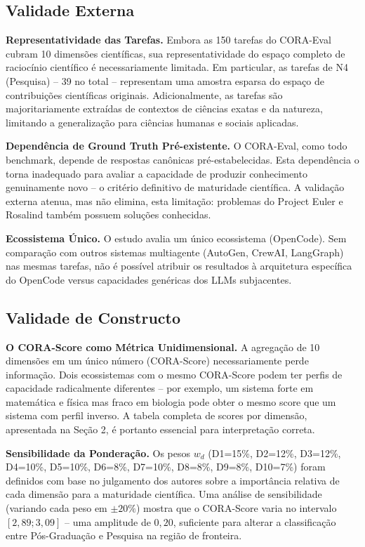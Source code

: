 \subsection{Validade Externa}

\textbf{Representatividade das Tarefas.} Embora as 150 tarefas do
CORA-Eval cubram 10 dimensões científicas, sua representatividade do
espaço completo de raciocínio científico é necessariamente limitada. Em
particular, as tarefas de N4 (Pesquisa) -- 39 no total -- representam
uma amostra esparsa do espaço de contribuições científicas originais.
Adicionalmente, as tarefas são majoritariamente extraídas de contextos de
ciências exatas e da natureza, limitando a generalização para ciências
humanas e sociais aplicadas.

\textbf{Dependência de Ground Truth Pré-existente.} O CORA-Eval, como
todo benchmark, depende de respostas canônicas pré-estabelecidas. Esta
dependência o torna inadequado para avaliar a capacidade de produzir
conhecimento genuinamente novo -- o critério definitivo de maturidade
científica. A validação externa atenua, mas não elimina, esta limitação:
problemas do Project Euler e Rosalind também possuem soluções conhecidas.

\textbf{Ecossistema Único.} O estudo avalia um único ecossistema
(OpenCode). Sem comparação com outros sistemas multiagente (AutoGen,
CrewAI, LangGraph) nas mesmas tarefas, não é possível atribuir os
resultados à arquitetura específica do OpenCode versus capacidades
genéricas dos LLMs subjacentes.

\subsection{Validade de Constructo}

\textbf{O CORA-Score como Métrica Unidimensional.} A agregação de 10
dimensões em um único número (CORA-Score) necessariamente perde
informação. Dois ecossistemas com o mesmo CORA-Score podem ter perfis
de capacidade radicalmente diferentes -- por exemplo, um sistema forte
em matemática e física mas fraco em biologia pode obter o mesmo score
que um sistema com perfil inverso. A tabela completa de scores por
dimensão, apresentada na Seção 2, é portanto essencial para
interpretação correta.

\textbf{Sensibilidade da Ponderação.} Os pesos $w_d$ (D1=15\%,
D2=12\%, D3=12\%, D4=10\%, D5=10\%, D6=8\%, D7=10\%, D8=8\%, D9=8\%,
D10=7\%) foram definidos com base no julgamento dos autores sobre a
importância relativa de cada dimensão para a maturidade científica. Uma
análise de sensibilidade (variando cada peso em $\pm 20\%$) mostra que o
CORA-Score varia no intervalo $[2{,}89; 3{,}09]$ -- uma amplitude de
$0{,}20$, suficiente para alterar a classificação entre Pós-Graduação e
Pesquisa na região de fronteira.

